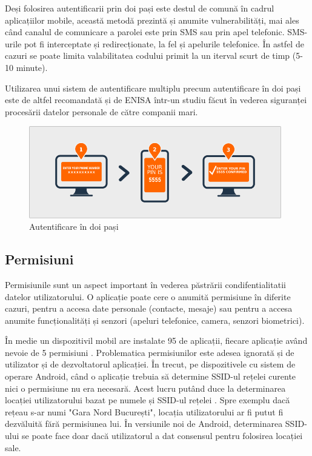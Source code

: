\documentclass[12pt]{article}
\begin{document}
Deși folosirea autentificarii prin doi pași este destul de comună în cadrul aplicațiilor mobile, această metodă
prezintă și anumite vulnerabilități, mai ales când canalul de comunicare a parolei este prin SMS sau prin 
apel telefonic.
SMS-urile pot fi interceptate și redirecționate, la fel și apelurile telefonice. În astfel de cazuri
se poate limita valabilitatea codului primit la un iterval scurt de timp (5-10 minute). 

Utilizarea unui sistem de autentificare multiplu precum autentificare în doi pași este de altfel recomandată
și de ENISA \cite{enisa-security-data-processing} într-un studiu făcut în vederea 
siguranței procesării datelor personale de către companii mari.

\begin{figure}[H]
\centering
\includegraphics[height=4cm]{wordpress-two-factor-authentication.png}
\caption{Autentificare în doi pași}
\end{figure}

\subsection{Permisiuni}

Permisiunile sunt un aspect important în vederea păstrării condifentialitatii datelor utilizatorului.
O aplicație poate cere o anumită permisiune în diferite cazuri, pentru a accesa date personale (contacte, mesaje)
sau pentru a accesa anumite funcționalități și senzori (apeluri telefonice, camera, senzori biometrici).

În medie un dispozitivil mobil are instalate 95 de aplicații, fiecare aplicație având nevoie
de 5 permisiuni \cite{liu2016follow}. Problematica permisiunilor este adesea ignorată și de utilizator
și de dezvoltatorul aplicației. 
În trecut, pe dispozitivele cu sistem de operare Android, când o aplicație trebuia
să determine SSID-ul rețelei curente nici o permisiune nu era necesară. Acest lucru putând duce la
determinarea locației utilizatorului bazat pe numele și SSID-ul rețelei \cite{ssidloc}. Spre exemplu dacă rețeau s-ar numi
"Gara Nord București", locația utilizatorului ar fi putut fi dezvăluită fără permisiunea lui. În versiunile noi de Android,
determinarea SSID-ului se poate face doar dacă utilizatorul a dat consensul pentru
folosirea locației sale.
\end{document}
